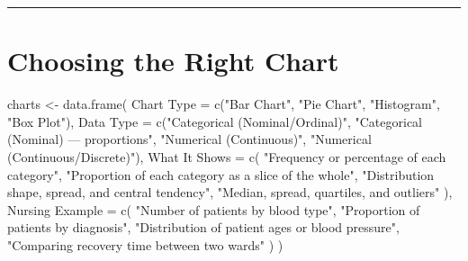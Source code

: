 \documentclass[
  12pt,
  letterpaper,
]{book}
\newenvironment{Shaded}{\begin{snugshade}}{\end{snugshade}}
\newcommand{\AttributeTok}[1]{\textcolor[rgb]{0.40,0.45,0.13}{#1}}
\newcommand{\FunctionTok}[1]{\textcolor[rgb]{0.28,0.35,0.67}{#1}}
\newcommand{\NormalTok}[1]{\textcolor[rgb]{0.00,0.23,0.31}{#1}}
\newcommand{\OtherTok}[1]{\textcolor[rgb]{0.00,0.23,0.31}{#1}}
\newcommand{\StringTok}[1]{\textcolor[rgb]{0.13,0.47,0.30}{#1}}
\begin{document}
\begin{center}\rule{0.5\linewidth}{0.5pt}\end{center}

\section{Choosing the Right Chart}\label{choosing-the-right-chart}

\begin{Shaded}
\begin{Highlighting}[]
\NormalTok{charts }\OtherTok{\textless{}{-}} \FunctionTok{data.frame}\NormalTok{(}
  \StringTok{\textasciigrave{}}\AttributeTok{Chart Type}\StringTok{\textasciigrave{}} \OtherTok{=} \FunctionTok{c}\NormalTok{(}\StringTok{"Bar Chart"}\NormalTok{, }\StringTok{"Pie Chart"}\NormalTok{, }\StringTok{"Histogram"}\NormalTok{, }\StringTok{"Box Plot"}\NormalTok{),}
  \StringTok{\textasciigrave{}}\AttributeTok{Data Type}\StringTok{\textasciigrave{}} \OtherTok{=} \FunctionTok{c}\NormalTok{(}\StringTok{"Categorical (Nominal/Ordinal)"}\NormalTok{,}
                   \StringTok{"Categorical (Nominal) — proportions"}\NormalTok{,}
                   \StringTok{"Numerical (Continuous)"}\NormalTok{,}
                   \StringTok{"Numerical (Continuous/Discrete)"}\NormalTok{),}
  \StringTok{\textasciigrave{}}\AttributeTok{What It Shows}\StringTok{\textasciigrave{}} \OtherTok{=} \FunctionTok{c}\NormalTok{(}
    \StringTok{"Frequency or percentage of each category"}\NormalTok{,}
    \StringTok{"Proportion of each category as a slice of the whole"}\NormalTok{,}
    \StringTok{"Distribution shape, spread, and central tendency"}\NormalTok{,}
    \StringTok{"Median, spread, quartiles, and outliers"}
\NormalTok{  ),}
  \StringTok{\textasciigrave{}}\AttributeTok{Nursing Example}\StringTok{\textasciigrave{}} \OtherTok{=} \FunctionTok{c}\NormalTok{(}
    \StringTok{"Number of patients by blood type"}\NormalTok{,}
    \StringTok{"Proportion of patients by diagnosis"}\NormalTok{,}
    \StringTok{"Distribution of patient ages or blood pressure"}\NormalTok{,}
    \StringTok{"Comparing recovery time between two wards"}
\NormalTok{  )}
\NormalTok{)}


\end{Highlighting}
\end{Shaded}
\end{document}
